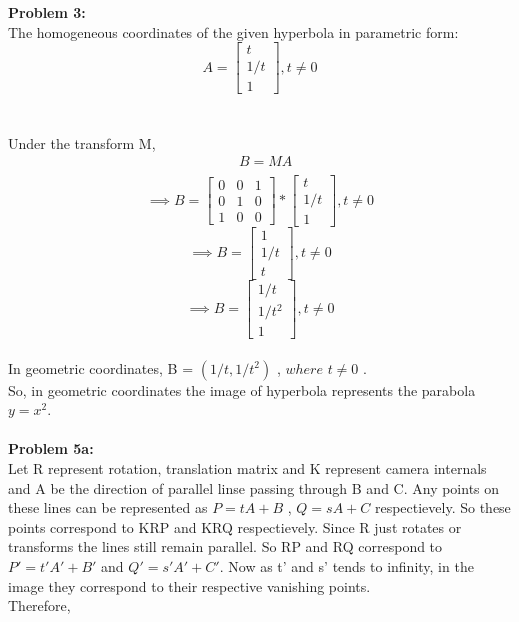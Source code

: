 \documentclass[a4paper]{article}
\begin{document}
\maketitle
\hrulefill
\\ \\
\textbf{Problem 3:} \\
The homogeneous coordinates of the given hyperbola in parametric form:
\[
A = 
\begin{bmatrix}
t \\
1/t \\
1
\end{bmatrix}
, t \neq 0 \]
\\  \\
Under the transform M,
\begin{equation*}
\begin{split}
& B = MA \\
\end{split}
\end{equation*}
\[
\implies
B =
\begin{bmatrix}
    0 & 0 & 1  \\
    0 & 1 & 0  \\
    1 & 0 & 0
    \end{bmatrix}
 *
    \begin{bmatrix}
    t \\
    1/t \\
    1
    \end{bmatrix}
    , t \neq 0 
\]
\[
\implies
B = 
\begin{bmatrix}
1 \\ 
1/t \\
t
\end{bmatrix}
, t \neq 0
\]
\[
\implies
B = 
\begin{bmatrix}
1/t \\ 
1/t^2 \\
1
\end{bmatrix}
, t \neq 0
\]
\\
In geometric coordinates, B = $ (1/t, 1/t^2)$ , $ where $ $ t \neq 0 $ . \\
So, in geometric coordinates the image of hyperbola represents the parabola $ y = x^2. $  
\\ \\
\textbf{Problem 5a:} \\
Let R represent rotation, translation matrix and K represent camera internals and A be the direction of parallel linse passing through B and C. Any points on these lines can be represented as $P=tA+B$ , $Q=sA+C$ respectievely. So these points correspond to KRP and KRQ respectievely. Since R just rotates or transforms the lines still remain parallel. So RP and RQ correspond to $P' = t'A'+B'$ and $Q'=s'A'+C'$. Now as t' and s' tends to infinity, in the image they correspond to their respective vanishing points.\\
Therefore, 
\end{document}
